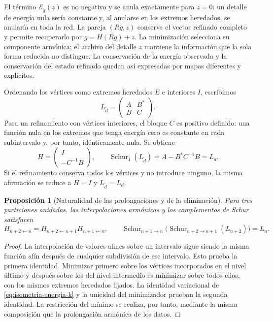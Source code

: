 \documentclass[a4paper,10pt]{article}
\newtheorem{proposition}[theorem]{Proposición}
\theoremstyle{definition}\newtheorem{definition}[theorem]{Definición}
\theoremstyle{remark}\newtheorem{remark}[theorem]{Observación}
\numberwithin{equation}{section}
\begin{document}
El término \(\mathcal E_{\widetilde d}(z)\) es no negativo y se anula
exactamente para \(z=0\): un detalle de energía nula sería constante y,
al anularse en los extremos heredados, se anularía en toda la red.
La pareja \((Rg,z)\) conserva el vector refinado completo y permite
recuperarlo por \(g=H(Rg)+z\). La minimización selecciona su
componente armónica; el archivo del detalle \(z\) mantiene la
información que la sola forma reducida no distingue. La conservación
de la energía observada y la conservación del estado refinado quedan
así expresadas por mapas diferentes y explícitos.

Ordenando los vértices como extremos heredados \(E\) e interiores \(I\),
escribimos
\[
 L_{\widetilde d}=\begin{pmatrix}A&B^*\\B&C\end{pmatrix}.
\]
Para un refinamiento con vértices interiores, el bloque \(C\) es
positivo definido: una función nula en los extremos
que tenga energía cero es constante en cada subintervalo y, por tanto,
idénticamente nula. Se obtiene
\begin{equation}
 H=\begin{pmatrix}I\\-C^{-1}B\end{pmatrix},\qquad
 \operatorname{Schur}_{I}(L_{\widetilde d})
 =A-B^*C^{-1}B=L_d.
 \label{eq:schur-intervalar-k}
\end{equation}
Si el refinamiento conserva todos los vértices y no introduce ninguno,
la misma afirmación se reduce a \(H=I\) y \(L_{\widetilde d}=L_d\).

\begin{proposition}[Naturalidad de las prolongaciones y de la eliminación]
\label{prop:energia-naturalidad-sucesiva}
Para tres particiones anidadas, las interpolaciones armónicas y los
complementos de Schur satisfacen
\begin{equation}
 H_{n+2\leftarrow n}
 =H_{n+2\leftarrow n+1}H_{n+1\leftarrow n},
 \qquad
 \operatorname{Schur}_{n+1\to n}
 \bigl(\operatorname{Schur}_{n+2\to n+1}(L_{n+2})\bigr)=L_n.
 \label{eq:energia-naturalidad-sucesiva}
\end{equation}
\end{proposition}
\begin{proof}
La interpolación de valores afines sobre un intervalo sigue siendo la
misma función afín después de cualquier subdivisión de ese intervalo.
Esto prueba la primera identidad. Minimizar primero sobre los vértices
incorporados en el nivel último y después sobre los del nivel intermedio
es minimizar sobre todos ellos, con los mismos extremos heredados fijados.
La identidad variacional de \eqref{eq:isometria-energia-k} y la unicidad
del minimizador prueban la segunda identidad. La restricción del mínimo
se realiza, por tanto, mediante la misma composición que la prolongación
armónica de los datos.
\end{proof}
\end{document}
